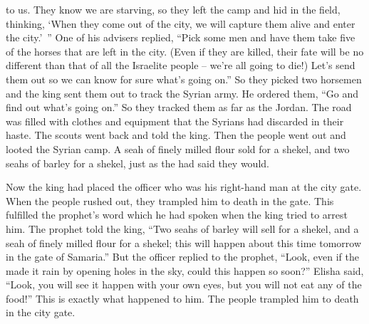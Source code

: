{to us. They know
we
are starving,
so they left
the camp
and hid
in the field,
thinking,
‘When
they come out
of the city,
we will capture
them alive
and enter
the city.’ ”
One
of his advisers
replied,
“Pick
some men
and have them take
five
of the horses
that
are left
in the city. (Even
if they are
killed, their fate
will be
no different
than
that
of all
the Israelite people – we’re all going to die!) Let’s send them out so we can know for sure what’s going on.”
So they picked
two
horsemen
and the king
sent
them out
to track
the Syrian
army.
He ordered
them, “Go
and find out what’s going on.”
So
they tracked
them as far
as the Jordan.
The road
was filled
with clothes
and equipment
that
the Syrians
had discarded
in their haste.
The scouts
went back
and told
the king.
Then the people
went out
and looted
the Syrian
camp.
A seah
of finely milled flour
sold for a shekel,
and two seahs
of barley
for a shekel,
just as the
{}
had said they would.
\par }{\PP {}Now the king
had placed
the officer
who
was his right-hand
man at the city gate.
When the people
rushed out, they trampled
him to death
in the gate.
This
fulfilled the
prophet’s
word
which
he had spoken
when the king
tried to arrest him.
The prophet
told
the king,
“Two seahs
of barley
will sell for a shekel,
and a seah
of finely milled flour
for a shekel;
this will happen
about this time
tomorrow
in the gate
of Samaria.”
But
the officer
replied
to the prophet,
“Look,
even if the
{}
made
it rain by opening holes
in the sky,
could
this
happen so soon?” Elisha said,
“Look,
you will see
it happen with your own eyes,
but you will not
eat
any of the food!”
This is exactly
what happened
to him.
The people
trampled
him to death
in the city gate.

}
